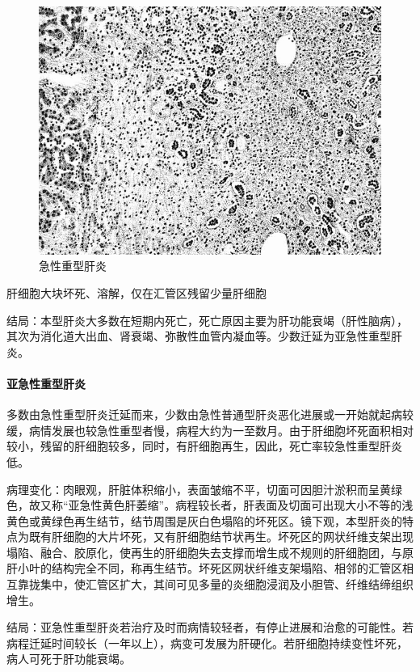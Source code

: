 \begin{figure}[!htbp]
 \centering
 \includegraphics{./images/Image00136.jpg}
 \captionsetup{justification=centering}
 \caption{急性重型肝炎}
 \label{fig8-8}
  \end{figure} 

{肝细胞大块坏死、溶解，仅在汇管区残留少量肝细胞}

结局：本型肝炎大多数在短期内死亡，死亡原因主要为肝功能衰竭（肝性脑病），其次为消化道大出血、肾衰竭、弥散性血管内凝血等。少数迁延为亚急性重型肝炎。

\paragraph{亚急性重型肝炎}
多数由急性重型肝炎迁延而来，少数由急性普通型肝炎恶化进展或一开始就起病较缓，病情发展也较急性重型者慢，病程大约为一至数月。由于肝细胞坏死面积相对较小，残留的肝细胞较多，同时，有肝细胞再生，因此，死亡率较急性重型肝炎低。

病理变化：肉眼观，肝脏体积缩小，表面皱缩不平，切面可因胆汁淤积而呈黄绿色，故又称“亚急性黄色肝萎缩”。病程较长者，肝表面及切面可出现大小不等的浅黄色或黄绿色再生结节，结节周围是灰白色塌陷的坏死区。镜下观，本型肝炎的特点为既有肝细胞的大片坏死，又有肝细胞结节状再生。坏死区的网状纤维支架出现塌陷、融合、胶原化，使再生的肝细胞失去支撑而增生成不规则的肝细胞团，与原肝小叶的结构完全不同，称再生结节。坏死区网状纤维支架塌陷、相邻的汇管区相互靠拢集中，使汇管区扩大，其间可见多量的炎细胞浸润及小胆管、纤维结缔组织增生。

结局：亚急性重型肝炎若治疗及时而病情较轻者，有停止进展和治愈的可能性。若病程迁延时间较长（一年以上），病变可发展为肝硬化。若肝细胞持续变性坏死，病人可死于肝功能衰竭。

